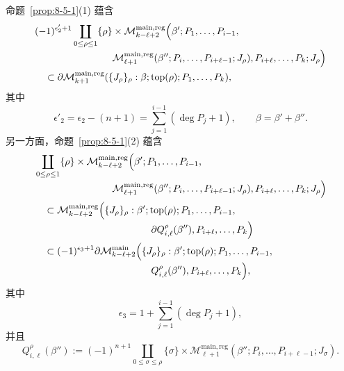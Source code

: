 命题~\ref{prop:8-5-1}(1) 蕴含
\[
\begin{aligned}
 &(-1)^{\epsilon'_2+1}
 \coprod_{0\leq\rho\leq1}\{\rho\}\times
 \mathcal M_{k-\ell+2}^{\mathrm{main},\mathrm{reg}}
 \Bigl(\beta';P_1,\ldots,P_{i-1},\\[-2pt]
 &\hspace{8em}
 \mathcal M_{\ell+1}^{\mathrm{main},\mathrm{reg}}
 (\beta'';P_i,\ldots,P_{i+\ell-1};J_\rho),
 P_{i+\ell},\ldots,P_k;J_\rho\Bigr)\\
 &\quad\subset
 \partial\mathcal M_{k+1}^{\mathrm{main},\mathrm{reg}}
 (\{J_\rho\}_\rho:\beta;\operatorname{top}(\rho);
 P_1,\ldots,P_k),
\end{aligned}
\]
其中
\[
 \epsilon'_2=\epsilon_2-(n+1)
 =\sum_{j=1}^{i-1}(\deg P_j+1),
 \qquad \beta=\beta'+\beta''.
\]
另一方面，命题~\ref{prop:8-5-1}(2) 蕴含
\[
\begin{aligned}
 &\coprod_{0\leq\rho\leq1}\{\rho\}\times
 \mathcal M_{k-\ell+2}^{\mathrm{main},\mathrm{reg}}
 \Bigl(\beta';P_1,\ldots,P_{i-1},\\[-2pt]
 &\hspace{8em}
 \mathcal M_{\ell+1}^{\mathrm{main},\mathrm{reg}}
 (\beta'';P_i,\ldots,P_{i+\ell-1};J_\rho),
 P_{i+\ell},\ldots,P_k;J_\rho\Bigr)\\
 &\quad\subset
 \mathcal M_{k-\ell+2}^{\mathrm{main},\mathrm{reg}}
 \Bigl(\{J_\rho\}_\rho:\beta';\operatorname{top}(\rho);
 P_1,\ldots,P_{i-1},\\[-2pt]
 &\hspace{12em}
 \partial Q_{i,\ell}^{\rho}(\beta''),
 P_{i+\ell},\ldots,P_k\Bigr)\\
 &\quad\subset
 (-1)^{\epsilon_3+1}
 \partial\mathcal M_{k-\ell+2}^{\mathrm{main}}
 \Bigl(\{J_\rho\}_\rho:\beta';\operatorname{top}(\rho);
 P_1,\ldots,P_{i-1},\\[-2pt]
 &\hspace{12em}
 Q_{i,\ell}^{\rho}(\beta''),
 P_{i+\ell},\ldots,P_k\Bigr),
\end{aligned}
\]
其中
\[
 \epsilon_3=1+\sum_{j=1}^{i-1}(\deg P_j+1),
\]
并且
\begin{equation}
 Q_{i,\ell}^{\rho}(\beta'')
 :=(-1)^{n+1}
 \coprod_{0\leq\sigma\leq\rho}
 \{\sigma\}\times
 \mathcal M_{\ell+1}^{\mathrm{main},\mathrm{reg}}
 (\beta'';P_i,\ldots,P_{i+\ell-1};J_\sigma).
\tag{8.9.2}\label{eq:8-9-2}
\end{equation}

